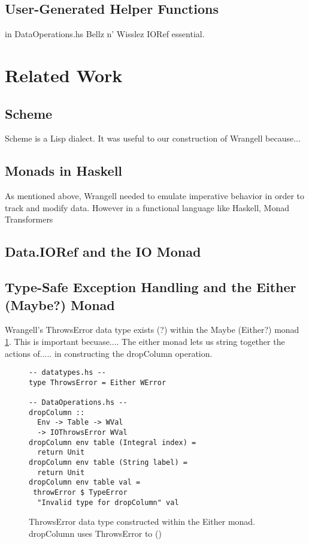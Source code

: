 \documentclass[preprint,nocopyrightspace]{sig-alternate}
\begin{document}
\subsection{User-Generated Helper Functions}
in DataOperations.hs
Bellz n' Wisslez
IORef essential. 

\section{Related Work}

\subsection{Scheme}
Scheme is a Lisp dialect. It was useful to our construction of Wrangell because...
\cite{scheme}

\subsection{Monads in Haskell}
As mentioned above, Wrangell needed to emulate imperative behavior in order to track and modify data. However in a functional language like Haskell, 
Monad Transformers \citep{monadTransform}






\subsection{Data.IORef and the IO Monad}

\subsection{Type-Safe Exception Handling and the Either (Maybe?) Monad}
Wrangell's ThrowsError data type exists (?) within the Maybe (Either?) monad  \ref{eitherThrowsError}.
This is important becuase....
The either monad lets us string together the actions of..... in constructing the dropColumn operation. 
\begin{figure}
\caption{ThrowsError data type constructed within the Either monad. dropColumn uses ThrowsError to ()}
\label{eitherThrowsError}
\begin{lstlisting}
-- datatypes.hs -- 
type ThrowsError = Either WError

-- DataOperations.hs --
dropColumn :: 
  Env -> Table -> WVal 
  -> IOThrowsError WVal
dropColumn env table (Integral index) = 
  return Unit
dropColumn env table (String label) = 
  return Unit
dropColumn env table val =
 throwError $ TypeError 
  "Invalid type for dropColumn" val
\end{lstlisting}
\end{figure} 
\end{document}
